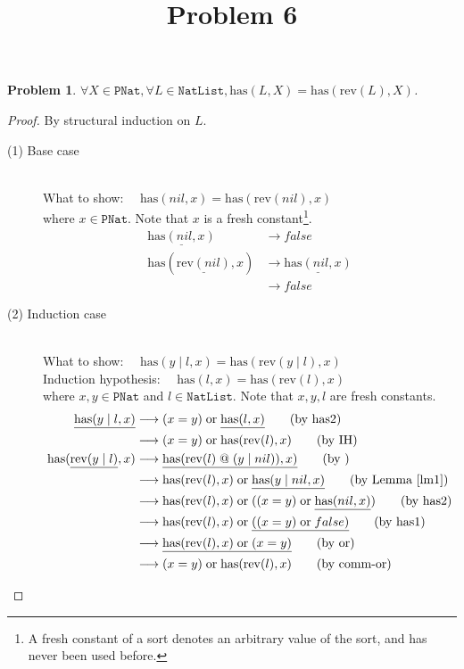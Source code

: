\documentclass[12pt, a4paper]{article}
\title{Problem 6}
\date{\vspace{-5ex}}
\newtheorem{problem}{Problem}
\newcommand{\rel}[1]{\mathrel{#1}}
\newcommand{\rmx}[1]{\mathrm{#1}}
\newcommand{\larrow}{\longrightarrow}
\newcommand{\under}{\underline}
\begin{document}
\maketitle

\begin{problem}
$\forall X \in \mathtt{PNat}, \forall L \in \mathtt{NatList}, \rmx{has}(L, X) = \rmx{has}(\rmx{rev}(L), X)$.
\end{problem}
\begin{proof}
By structural induction on $L$.

\begin{description}
\item[(1) Base case]~\\
\noindent
What to show: $\quad \rmx{has}(nil, x) = \rmx{has}(\rmx{rev}(nil), x)$ \\
where $x \in \mathtt{PNat}$. Note that $x$ is a fresh constant\footnote{A fresh constant of a sort denotes an arbitrary value of the sort, and has never been used before.}.
\begin{align*}
\under{\rmx{has}(nil, x)}
	&\larrow false \tag{by has1} \\
\rmx{has}(\under{\rmx{rev}(nil)}, x)
	&\larrow \under{\rmx{has}(nil, x)} \tag{by rev1} \\
	&\larrow false \tag{by has1}
\end{align*}

\item[(2) Induction case]~\\
What to show: $\quad \rmx{has}(y \rel{|} l, x) = \rmx{has}(\rmx{rev}(y \rel{|} l), x)$ \\
Induction hypothesis: $\quad \rmx{has}(l, x) = \rmx{has}(\rmx{rev}(l), x)$  \\
where $x, y \in \mathtt{PNat}$ and $l \in \mathtt{NatList}$. Note that $x, y, l$ are fresh constants.
\begin{align*}
\under{\rmx{has}(y \rel{|} l, x)}
	&\larrow (x = y) \rel{\rmx{or}} \under{\rmx{has}(l, x)}  \tag{by has2} \\
	&\larrow (x = y) \rel{\rmx{or}} \rmx{has}(\rmx{rev}(l), x)  \tag{by IH} \\
\rmx{has}(\under{\rmx{rev}(y \rel{|} l)}, x)
	&\larrow \under{\rmx{has}(\rmx{rev}(l) \rel{@} (y \rel{|} nil)), x)} \tag{by } \\
	&\larrow \rmx{has}(\rmx{rev}(l), x) \rel{\rmx{or}} \under{\rmx{has}(y \rel{|} nil, x)} \tag{by Lemma~\ref{lm1}} \\
	&\larrow \rmx{has}(\rmx{rev}(l), x) \rel{\rmx{or}} ((x = y) \rel{\rmx{or}} \under{\rmx{has}(nil, x)}) \tag{by has2} \\
	&\larrow \rmx{has}(\rmx{rev}(l), x) \rel{\rmx{or}} \under{((x = y) \rel{\rmx{or}} false)} \tag{by has1} \\
	&\larrow \under{\rmx{has}(\rmx{rev}(l), x) \rel{\rmx{or}} (x = y)} \tag{by or} \\
	&\larrow (x = y) \rel{\rmx{or}} \rmx{has}(\rmx{rev}(l), x) \tag{by comm-or}
\end{align*}

\end{description}

\end{proof}
\end{document}
